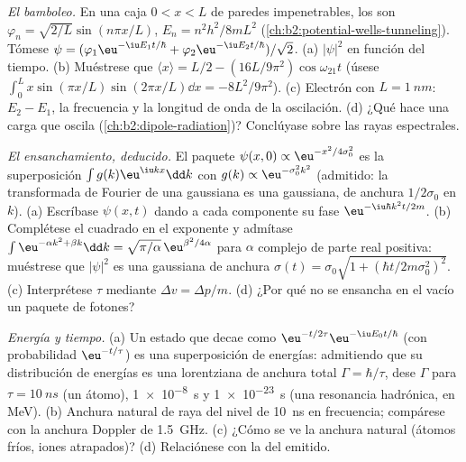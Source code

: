 \begin{exercise}[$\star\star\star$]\label{exo:b2:schrodinger-wave-functions:10}
\emph{El bamboleo.} En una caja $0 < x < L$ de paredes impenetrables, los
 son $\varphi_n = \sqrt{2/L}\sin(n\pi x/L)$, $E_n =
n^2h^2/8mL^2$ (\cref{ch:b2:potential-wells-tunneling}). Tómese $\psi =
(\varphi_1\eu^{-\iu E_1t/\hbar} + \varphi_2\eu^{-\iu E_2t/\hbar})/\sqrt2$. (a)
$|\psi|^2$ en función del tiempo. (b) Muéstrese que $\langle x\rangle = L/2 -
(16L/9\pi^2)\cos\omega_{21}t$ (úsese $\int_0^L x\sin(\pi x/L)\sin(2\pi x/L)\dd x
= -8L^2/9\pi^2$). (c) Electrón con $L = \qty{1}{nm}$: $E_2 - E_1$, la
frecuencia y la longitud de onda de la oscilación. (d) ¿Qué hace una carga
que oscila (\cref{ch:b2:dipole-radiation})? Conclúyase sobre las
rayas espectrales.
\end{exercise}

\begin{exercise}[$\star\star\star$]\label{exo:b2:schrodinger-wave-functions:11}
\emph{El ensanchamiento, deducido.} El paquete $\psi(x,0) \propto \eu^{-x^2/4\sigma_0^2}$
es la superposición $\int g(k)\eu^{\iu kx}\dd k$ con $g(k) \propto
\eu^{-\sigma_0^2k^2}$ (admitido: la transformada de Fourier de una gaussiana es una
gaussiana, de anchura $1/2\sigma_0$ en $k$). (a) Escríbase $\psi(x,t)$ dando a cada
componente su fase $\eu^{-\iu\hbar k^2t/2m}$. (b) Complétese el cuadrado en
el exponente y admítase $\int\eu^{-\alpha k^2 + \beta k}\dd k = \sqrt{\pi/\alpha}\,
\eu^{\beta^2/4\alpha}$ para $\alpha$ complejo de parte real positiva: muéstrese que
$|\psi|^2$ es una gaussiana de anchura $\sigma(t) = \sigma_0\sqrt{1 + (\hbar t/2m
\sigma_0^2)^2}$. (c) Interprétese $\tau$ mediante $\Delta v = \Delta p/m$. (d) ¿Por qué no
se ensancha en el vacío un paquete de fotones?
\end{exercise}

\begin{exercise}[$\star\star\star$]\label{exo:b2:schrodinger-wave-functions:12}
\emph{Energía y tiempo.} (a) Un estado que decae como $\eu^{-t/2\tau}\eu^{-\iu E_0t/\hbar}$
(con probabilidad $\eu^{-t/\tau}$) es una superposición de energías: admitiendo
que su distribución de energías es una lorentziana de anchura total $\Gamma =
\hbar/\tau$, dese $\Gamma$ para $\tau = \qty{10}{ns}$ (un átomo), \qty{1e-8}{s} y
\qty{1e-23}{s} (una resonancia hadrónica, en MeV). (b) Anchura natural de raya del
nivel de \qty{10}{ns} en frecuencia; compárese con la anchura Doppler de
\qty{1.5}{GHz}. (c) ¿Cómo se ve la anchura natural (átomos fríos,
iones atrapados)? (d) Relaciónese con la  del 
emitido.
\end{exercise}

